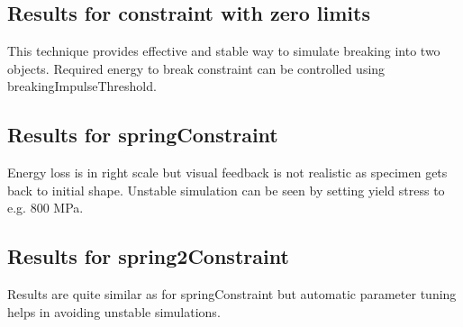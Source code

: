 \subsection{Results for constraint with zero limits}
This technique provides effective and stable way to simulate breaking into two objects. 
Required energy to break constraint can be controlled using
breakingImpulseThreshold. 

\subsection{Results for springConstraint}
Energy loss is in right scale but visual feedback is not realistic as specimen gets back to initial shape.
Unstable simulation can be seen by setting yield stress to e.g. 800 MPa.

\subsection{Results for spring2Constraint}
Results are quite similar as for springConstraint but automatic parameter tuning helps in avoiding unstable simulations.



\cleardoublepage
